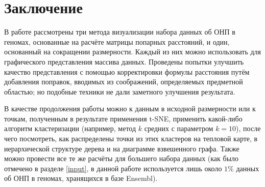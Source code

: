 \documentclass[main.tex]{subfiles}
\begin{document}
\section{Заключение}

В работе рассмотрены три метода визуализации набора данных об ОНП в геномах, основанные на расчёте матрицы попарных расстояний, и один, основанный на сокращении размерности.
Каждый из них можно использовать для графического представления массива данных. Проведены попытки улучшить качество представления с помощью корректировки формулы расстояния путём добавления поправок, вводимых из соображений, определяемых предметной областью; но подобные техники не дали заметного улучшения результата.

В качестве продолжения работы можно к данным в исходной размерности или к точкам, полученным в результате применения t-SNE, применить какой-либо алгоритм кластеризации (например, метод $k$ средних с параметром $k=10$), после чего посмотреть, как распределены точки из этих кластеров на тепловой карте, в иерархической структуре дерева и на диаграмме взвешенного графа.
Также можно провести все те же расчёты для большего набора данных (как было отмечено в разделе \ref{input}, в данной работе используется лишь около $1\%$ данных об ОНП в геномах, хранящихся в базе Ensembl).
\end{document}
